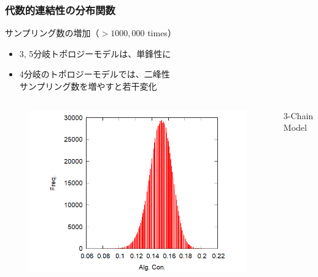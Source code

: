 \documentclass[11pt, dvipdfmx]{beamer}
\begin{document}
\begin{frame}
\begin{columns}[totalwidth=1\textwidth]
\end{columns}

\end{frame}

\begin{frame}
\frametitle{代数的連結性の分布関数}

\begin{exampleblock}{サンプリング数の増加（$> 1000,000$ times）}
\begin{itemize}
\item
3, 5分岐トポロジーモデルは、単鋒性に
\item
4分岐のトポロジーモデルでは、二峰性\\
サンプリング数を増やすと若干変化
\end{itemize}
\end{exampleblock}

\vspace{-6mm}
\begin{columns}[totalwidth=1\textwidth]
\begin{figure}
\includegraphics[width=1.2\columnwidth]{./fig/3.png}
\end{figure}
\vspace{-3mm}
\centering
\small
3-Chain Model


\end{columns}
\end{frame}
\end{document}

